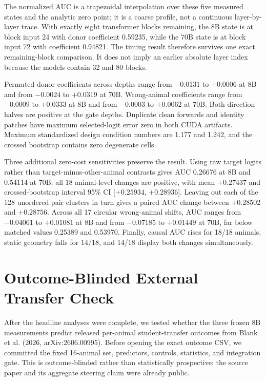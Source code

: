 \documentclass[letterpaper]{article}
\newcommand{\CI}[2]{95\% CI [#1, #2]}
\begin{document}
The normalized AUC is a trapezoidal interpolation over these five measured
states and the analytic zero point; it is a coarse profile, not a continuous
layer-by-layer trace. With exactly eight transformer blocks remaining, the 8B
state is at block input 24 with donor coefficient 0.59235, while the 70B state
is at block input 72 with coefficient 0.94821. The timing result therefore
survives one exact remaining-block comparison. It does not imply an earlier
absolute layer index because the models contain 32 and 80 blocks.

Permuted-donor coefficients across depths range from $-0.0131$ to $+0.0006$ at
8B and from $-0.0024$ to $+0.0319$ at 70B. Wrong-animal coefficients range from
$-0.0009$ to $+0.0333$ at 8B and from $-0.0003$ to $+0.0062$ at 70B. Both
direction halves are positive at the gate depths. Duplicate clean forwards and
identity patches have maximum selected-logit error zero in both CUDA artifacts.
Maximum standardized design condition numbers are 1.177 and 1.242, and the
crossed bootstrap contains zero degenerate cells.

Three additional zero-cost sensitivities preserve the result. Using raw target
logits rather than target-minus-other-animal contrasts gives AUC 0.26676 at 8B
and 0.54114 at 70B; all 18 animal-level changes are positive, with mean
$+0.27437$ and crossed-bootstrap interval
\CI{$+0.25934$}{$+0.28936$}. Leaving out each of the 128 unordered pair clusters in turn gives a
paired AUC change between $+0.28502$ and $+0.28756$. Across all 17 circular
wrong-animal shifts, AUC ranges from $-0.04061$ to $+0.01081$ at 8B and from
$-0.07185$ to $+0.01449$ at 70B, far below matched values 0.25389 and 0.53970.
Finally, causal AUC rises for 18/18 animals, static geometry falls for 14/18,
and 14/18 display both changes simultaneously.

\section{Outcome-Blinded External Transfer Check}

After the headline analyses were complete, we tested whether the three frozen
8B measurements predict released per-animal student-transfer outcomes from
Blank et al. (2026, arXiv:2606.00995). Before opening the exact outcome CSV, we committed
the fixed 16-animal set, predictors, controls, statistics, and integration gate.
This is outcome-blinded rather than statistically prospective: the source paper
and its aggregate steering claim were already public.
\end{document}
